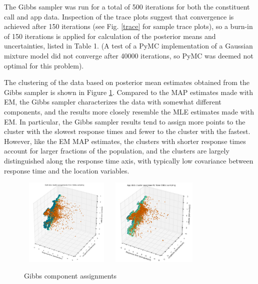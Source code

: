 \documentclass[twoside]{article}
\theoremstyle{theorem}
\theoremstyle{theorem}
\theoremstyle{theorem}
\theoremstyle{lemma}
\theoremstyle{definition}
\theoremstyle{example}
\begin{document}
The Gibbs sampler was run for a total of 500 iterations for both the constituent call and app data. Inspection of the trace plots suggest that convergence is achieved after 150 iterations (see Fig. \ref{trace} for sample trace plots), so a burn-in of 150 iterations is applied for calculation of the posterior means and uncertainties, listed in Table 1. (A test of a PyMC implementation of a Gaussian mixture model did not converge after 40000 iterations, so PyMC was deemed not optimal for this problem). 

The clustering of the data based on posterior mean estimates obtained from the Gibbs sampler is shown in Figure \ref{gibbsclusters}. Compared to the MAP estimates made with EM, the Gibbs sampler characterizes the data with somewhat different components, and the results more closely resemble the MLE estimates made with EM. In particular, the Gibbs sampler results tend to assign more points to the cluster with the slowest response times and fewer to the cluster with the fastest. However, like the EM MAP estimates, the clusters with shorter response times account for larger fractions of the population, and the clusters are largely distinguished along the response time axis, with typically low covariance between response time and the location variables. 

\begin{figure}[h!]
\begin{center}
\includegraphics[width=45mm, height=42mm]{gibbscallclusterassignments}
\includegraphics[width=45mm, height=42mm]{gibbsappclusterassignments}
\caption{Gibbs component assignments}
\label{gibbsclusters}
\end{center}
\end{figure}
\end{document}
